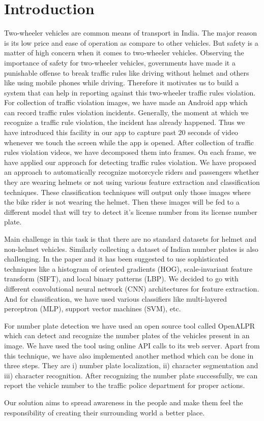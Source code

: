 \chapter{Introduction}
Two-wheeler vehicles are common means of transport in India. The major reason is its low price and ease of operation as compare to other vehicles. But safety is a matter of high concern when it comes to two-wheeler vehicles. Observing the importance of safety for two-wheeler vehicles, governments have made it a punishable offense to break traffic rules like driving without helmet and others like using mobile phones while driving. Therefore it motivates us to build a system that can help in reporting against this two-wheeler traffic rules violation. For collection of traffic violation images, we have made an Android app which can record traffic rules violation incidents. Generally, the moment at which we recognize a traffic rule violation, the incident has already happened. Thus we have introduced this facility in our app to capture past 20 seconds of video whenever we touch the screen while the app is opened.  After collection of traffic rules violation videos, we have decomposed them into frames. On each frame, we have applied our approach for detecting traffic rules violation. We have proposed an approach to automatically recognize motorcycle riders and passengers whether they are wearing helmets or not using various feature extraction and classification techniques. These classification techniques will output only those images where the bike rider is not wearing the helmet. Then these images will be fed to a different model that will try to detect it’s license number from its license number plate.
\par Main challenge in this task is that there are no standard datasets for helmet and non-helmet vehicles. Similarly collecting a dataset of Indian number plates is also challenging. In the paper \cite{b4} and \cite{b5} it has been suggested to use sophisticated techniques like a histogram of oriented gradients (HOG), scale-invariant feature transform (SIFT), and local binary patterns (LBP). We decided to go with different convolutional neural network (CNN) architectures for feature extraction. And for classification, we have used various classifiers like multi-layered perceptron (MLP), support vector machines (SVM), etc.
\par For number plate detection we have used an open source tool called OpenALPR \cite{b0} which can detect and recognize the number plates of the vehicles present in an image. We have used the tool using online API calls to its web server. Apart from this technique, we have also implemented another method which can be done in three steps. They are i) number plate localization, ii) character segmentation and iii) character recognition. After recognizing the number plate successfully, we can report the vehicle number to the traffic police department for proper actions.
\par Our solution aims to spread awareness in the people and make them feel the responsibility of creating their surrounding world a better place.
